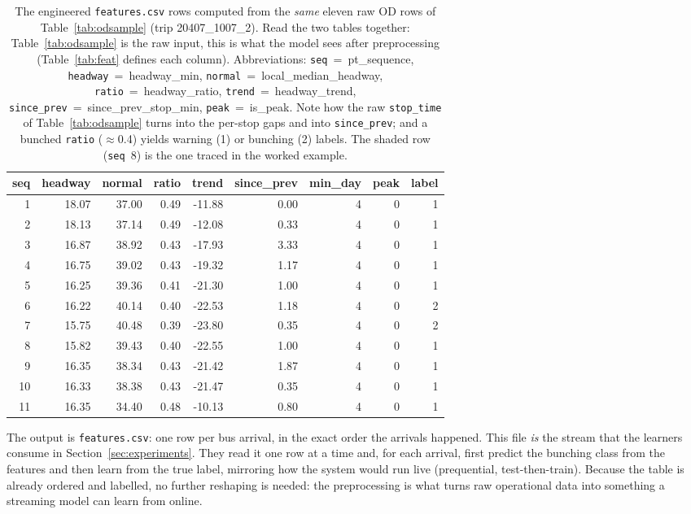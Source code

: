 \documentclass[11pt,a4paper]{article}
\begin{document}
\begin{table}[H]
\centering
\setlength{\tabcolsep}{4pt}
\scriptsize
\caption{The engineered \texttt{features.csv} rows computed from the \emph{same} eleven raw OD rows
of Table~\ref{tab:odsample} (trip 20407\_1007\_2). Read the two tables together:
Table~\ref{tab:odsample} is the raw input, this is what the model sees after preprocessing
(Table~\ref{tab:feat} defines each column). Abbreviations: \texttt{seq}~=~pt\_sequence,
\texttt{headway}~=~headway\_min, \texttt{normal}~=~local\_median\_headway,
\texttt{ratio}~=~headway\_ratio, \texttt{trend}~=~headway\_trend,
\texttt{since\_prev}~=~since\_prev\_stop\_min,
\texttt{peak}~=~is\_peak. Note how the raw \texttt{stop\_time}
of Table~\ref{tab:odsample} turns into the per-stop gaps and into
\texttt{since\_prev}; and a bunched
\texttt{ratio} ($\approx$0.4) yields warning (1) or bunching (2) labels. The shaded row
(\texttt{seq}~8) is the one traced in the worked example.}
\label{tab:featsample}
\begin{tabular}{rrrrrrrrr}
\toprule
seq & headway & normal & ratio & trend & since\_prev & min\_day & peak & label \\
\midrule
1  & 18.07 & 37.00 & 0.49 & -11.88 & 0.00 & 4 & 0 & 1 \\
2  & 18.13 & 37.14 & 0.49 & -12.08 & 0.33 & 4 & 0 & 1 \\
3  & 16.87 & 38.92 & 0.43 & -17.93 & 3.33 & 4 & 0 & 1 \\
4  & 16.75 & 39.02 & 0.43 & -19.32 & 1.17 & 4 & 0 & 1 \\
5  & 16.25 & 39.36 & 0.41 & -21.30 & 1.00 & 4 & 0 & 1 \\
6  & 16.22 & 40.14 & 0.40 & -22.53 & 1.18 & 4 & 0 & 2 \\
7  & 15.75 & 40.48 & 0.39 & -23.80 & 0.35 & 4 & 0 & 2 \\
\rowcolor{gray!15} 8  & 15.82 & 39.43 & 0.40 & -22.55 & 1.00 & 4 & 0 & 1 \\
9  & 16.35 & 38.34 & 0.43 & -21.42 & 1.87 & 4 & 0 & 1 \\
10 & 16.33 & 38.38 & 0.43 & -21.47 & 0.35 & 4 & 0 & 1 \\
11 & 16.35 & 34.40 & 0.48 & -10.13 & 0.80 & 4 & 0 & 1 \\
\bottomrule
\end{tabular}
\end{table}

The output is \texttt{features.csv}: one row per bus arrival, in the exact order the arrivals
happened. This file \emph{is} the stream that the learners consume in Section~\ref{sec:experiments}.
They read it one row at a time and, for each arrival, first predict the bunching class from the
features and then learn from the true label, mirroring how the system would run live (prequential,
test-then-train). Because the table is already ordered and labelled, no further reshaping is needed:
the preprocessing is what turns raw operational data into something a streaming model can learn from
online.
\end{document}
